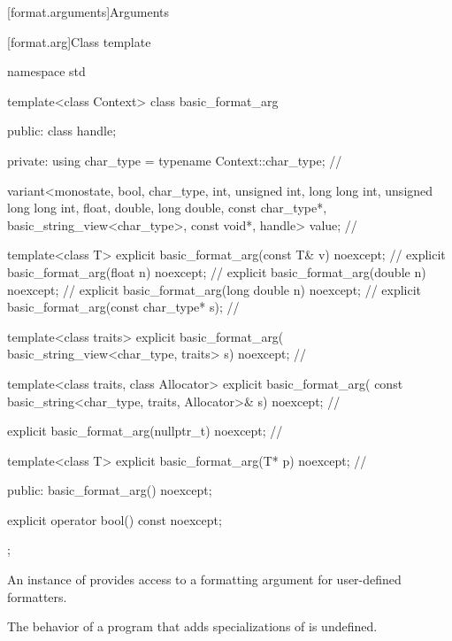 [format.arguments]{Arguments}

[format.arg]{Class template }

%
\begin{codeblock}
namespace std {
  template<class Context>
  class basic_format_arg {
  public:
    class handle;

  private:
    using char_type = typename Context::char_type;                              // \expos

    variant<monostate, bool, char_type,
            int, unsigned int, long long int, unsigned long long int,
            float, double, long double,
            const char_type*, basic_string_view<char_type>,
            const void*, handle> value;                                         // \expos

    template<class T> explicit basic_format_arg(const T& v) noexcept;           // \expos
    explicit basic_format_arg(float n) noexcept;                                // \expos
    explicit basic_format_arg(double n) noexcept;                               // \expos
    explicit basic_format_arg(long double n) noexcept;                          // \expos
    explicit basic_format_arg(const char_type* s);                              // \expos

    template<class traits>
      explicit basic_format_arg(
        basic_string_view<char_type, traits> s) noexcept;                       // \expos

    template<class traits, class Allocator>
      explicit basic_format_arg(
        const basic_string<char_type, traits, Allocator>& s) noexcept;          // \expos

    explicit basic_format_arg(nullptr_t) noexcept;                              // \expos

    template<class T>
      explicit basic_format_arg(T* p) noexcept;                                 // \expos

  public:
    basic_format_arg() noexcept;

    explicit operator bool() const noexcept;
  };
}
\end{codeblock}

\pnum
An instance of  provides access to
a formatting argument for user-defined formatters.

\pnum
The behavior of a program that adds specializations of
 is undefined.

